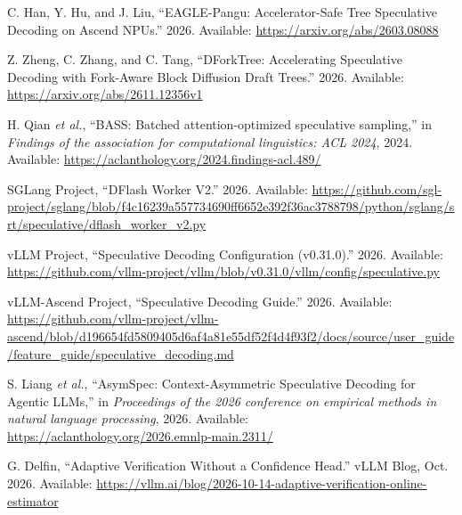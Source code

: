 \documentclass[11pt,a4paper,UTF8,fontset=none,scheme=plain,zihao=-4]{ctexart}
\newenvironment{CSLReferences}[2]{%
  \footnotesize
  \raggedright
  \setlength{\leftskip}{3em}%
  \setlength{\parindent}{-3em}%
  \setlength{\parskip}{0.1\baselineskip}%
  \sloppy
}{}
\newcommand{\CSLLeftMargin}[1]{\makebox[3em][l]{#1}}
\newcommand{\CSLRightInline}[1]{#1}
\begin{document}
\begin{CSLReferences}{0}{0}
\leavevmode{}%
\CSLLeftMargin{{[}67{]} }
\CSLRightInline{C. Han, Y. Hu, and J. Liu, {``{EAGLE-Pangu:
Accelerator-Safe Tree Speculative Decoding on Ascend NPUs}.''} 2026.
Available: \url{https://arxiv.org/abs/2603.08088}}

\leavevmode{}%
\CSLLeftMargin{{[}68{]} }
\CSLRightInline{Z. Zheng, C. Zhang, and C. Tang, {``{DForkTree:
Accelerating Speculative Decoding with Fork-Aware Block Diffusion Draft
Trees}.''} 2026. Available: \url{https://arxiv.org/abs/2611.12356v1}}

\leavevmode{}%
\CSLLeftMargin{{[}69{]} }
\CSLRightInline{H. Qian \emph{et al.}, {``BASS: Batched
attention-optimized speculative sampling,''} in \emph{Findings of the
association for computational linguistics: ACL 2024}, 2024. Available:
\url{https://aclanthology.org/2024.findings-acl.489/}}

\leavevmode{}%
\CSLLeftMargin{{[}70{]} }
\CSLRightInline{SGLang Project, {``{DFlash Worker V2}.''} 2026.
Available:
\url{https://github.com/sgl-project/sglang/blob/f4c16239a557734690ff6652e392f36ac3788798/python/sglang/srt/speculative/dflash_worker_v2.py}}

\leavevmode{}%
\CSLLeftMargin{{[}71{]} }
\CSLRightInline{vLLM Project, {``{Speculative Decoding Configuration
(v0.31.0)}.''} 2026. Available:
\url{https://github.com/vllm-project/vllm/blob/v0.31.0/vllm/config/speculative.py}}

\leavevmode{}%
\CSLLeftMargin{{[}72{]} }
\CSLRightInline{vLLM-Ascend Project, {``{Speculative Decoding Guide}.''}
2026. Available:
\url{https://github.com/vllm-project/vllm-ascend/blob/d196654fd5809405d6af4a81e55df52f4d4f93f2/docs/source/user_guide/feature_guide/speculative_decoding.md}}

\leavevmode{}%
\CSLLeftMargin{{[}73{]} }
\CSLRightInline{S. Liang \emph{et al.}, {``{AsymSpec: Context-Asymmetric
Speculative Decoding for Agentic LLMs},''} in \emph{Proceedings of the
2026 conference on empirical methods in natural language processing},
2026. Available: \url{https://aclanthology.org/2026.emnlp-main.2311/}}

\leavevmode{}%
\CSLLeftMargin{{[}74{]} }
\CSLRightInline{G. Delfin, {``{Adaptive Verification Without a
Confidence Head}.''} vLLM Blog, Oct. 2026. Available:
\url{https://vllm.ai/blog/2026-10-14-adaptive-verification-online-estimator}}


\end{CSLReferences}
\end{document}
